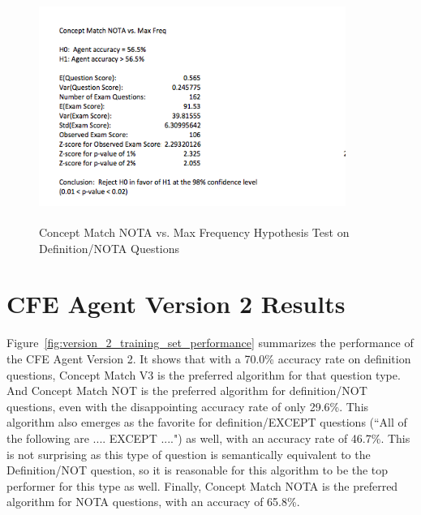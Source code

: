\begin{figure}
\centering
\vspace{0.75in}
\includegraphics[width=100mm, height=75mm]{concept_match_nota_hypothesis_test.png}
\caption{Concept Match NOTA vs. Max Frequency Hypothesis Test on Definition/NOTA  Questions}
\label{fig:concept_match_nota_hypothesis_test}
\end{figure}





\section{CFE Agent Version 2 Results}

Figure~\ref{fig:version_2_training_set_performance} summarizes the performance of the CFE Agent Version 2.  It shows that with a 70.0\% accuracy rate on definition questions, Concept Match V3 is the preferred algorithm for that question type.  And Concept Match NOT is the preferred algorithm for definition/NOT questions, even with the disappointing accuracy rate of only  29.6\%.  This algorithm also emerges as the favorite for definition/EXCEPT questions (``All of the following are .... EXCEPT ....") as well, with an accuracy rate of 46.7\%.  This is not surprising as this type of question is semantically equivalent to the Definition/NOT question, so it is reasonable for this algorithm to be the top performer for this type as well.  Finally, Concept Match NOTA is the preferred algorithm for NOTA questions, with an accuracy of 65.8\%.


